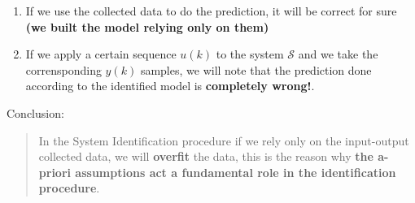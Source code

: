 \begin{enumerate}
    \item If we use the collected data to do the prediction, it will be correct for sure \textbf{(we built the model relying only on them)}
    \item If we apply a certain sequence $u(k)$ to the system $\mathcal{S}$ and we take the corrensponding $y(k)$ samples, we will note that the prediction done according to the identified model is \textbf{completely wrong!}.
\end{enumerate}
Conclusion:
\begin{quote}
    \large{\color{blue}
        In the System Identification procedure if we rely only on the input-output collected data, we will \textbf{overfit} the data, this is the reason why \textbf{the a-priori assumptions act a fundamental role in the identification procedure}.
    }
\end{quote}


